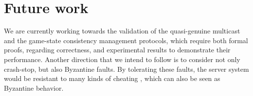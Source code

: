 \documentclass[]{usiinfprospectus}
\begin{document}
% 
% 
% 
% 
% 
% 
% 
% 
% 
% 
% 

\section{Future work} \label{sec:futurework}

We are currently working towards the validation of the quasi-genuine multicast and the game-state consistency management protocols, which require both formal proofs, regarding correctness, and experimental results to demonstrate their performance. Another direction that we intend to follow is to consider not only crash-stop, but also Byzantine faults. By tolerating these faults, the server system would be resistant to many kinds of cheating \cite{yan2005scc}, which can also be seen as Byzantine behavior.
\end{document}
